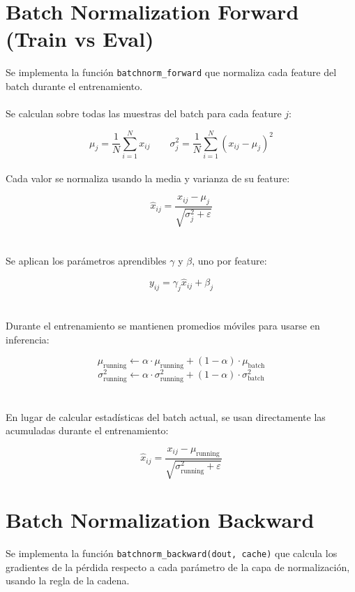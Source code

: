 \documentclass[12pt, letterpaper]{article}
\begin{document}
\newpage

\section{Batch Normalization Forward (Train vs Eval)}

Se implementa la función \texttt{batchnorm\_forward} que normaliza cada feature del batch durante el entrenamiento. \\ \\ 

Se calculan sobre todas las muestras del batch para cada feature $j$:

\[
\mu_j = \frac{1}{N} \sum_{i=1}^{N} x_{ij} \qquad
\sigma^2_j = \frac{1}{N} \sum_{i=1}^{N} (x_{ij} - \mu_j)^2
\] \\ 

Cada valor se normaliza usando la media y varianza de su feature:

\[
\hat{x}_{ij} = \frac{x_{ij} - \mu_j}{\sqrt{\sigma^2_j + \varepsilon}}
\] \\ \\ 


Se aplican los parámetros aprendibles $\gamma$ y $\beta$, uno por feature:

\[
y_{ij} = \gamma_j \hat{x}_{ij} + \beta_j
\] \\ \\

Durante el entrenamiento se mantienen promedios móviles para usarse en inferencia:

\[
\mu_{\text{running}} \leftarrow \alpha \cdot \mu_{\text{running}} + (1 - \alpha) \cdot \mu_{\text{batch}}
\]
\[
\sigma^2_{\text{running}} \leftarrow \alpha \cdot \sigma^2_{\text{running}} + (1 - \alpha) \cdot \sigma^2_{\text{batch}}
\] \\ \\ 

En lugar de calcular estadísticas del batch actual, se usan directamente las acumuladas durante el entrenamiento:

\[
\hat{x}_{ij} = \frac{x_{ij} - \mu_{\text{running}}}{\sqrt{\sigma^2_{\text{running}} + \varepsilon}}
\]


\newpage

\section{Batch Normalization Backward}

Se implementa la función \texttt{batchnorm\_backward(dout, cache)} que calcula los gradientes de la pérdida respecto a cada parámetro de la capa de normalización, usando la regla de la cadena.
\end{document}
